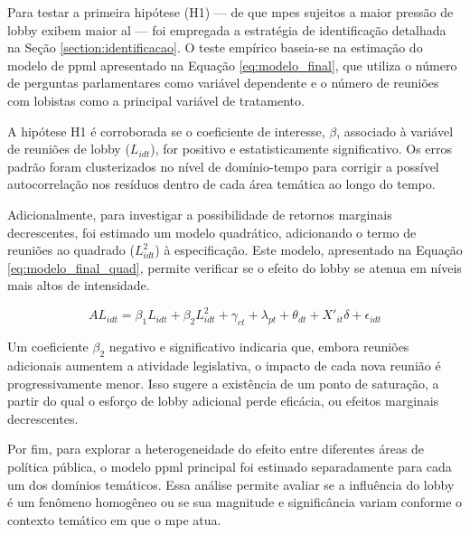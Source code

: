 Para testar a primeira hipótese (H1) — de que \acrshort{mpe}s sujeitos a maior pressão de lobby exibem maior \acrshort{al} — foi empregada a estratégia de identificação detalhada na Seção \ref{section:identificacao}. O teste empírico baseia-se na estimação do modelo de \acrshort{ppml} apresentado na Equação \ref{eq:modelo_final}, que utiliza o número de perguntas parlamentares como variável dependente e o número de reuniões com lobistas como a principal variável de tratamento.

A hipótese H1 é corroborada se o coeficiente de interesse, $\beta$, associado à variável de reuniões de lobby ($L_{idt}$), for positivo e estatisticamente significativo. Os erros padrão foram clusterizados no nível de domínio-tempo para corrigir a possível autocorrelação nos resíduos dentro de cada área temática ao longo do tempo.

Adicionalmente, para investigar a possibilidade de retornos marginais decrescentes, foi estimado um modelo quadrático, adicionando o termo de reuniões ao quadrado ($L_{idt}^2$) à especificação. Este modelo, apresentado na Equação \ref{eq:modelo_final_quad}, permite verificar se o efeito do lobby se atenua em níveis mais altos de intensidade.

\begin{equation}
    \label{eq:modelo_final_quad}
    AL_{idt} = \beta_1 L_{idt} + \beta_2 L_{idt}^2 + \gamma_{ct} + \lambda_{pt} + \theta_{dt} + X'_{it}\delta + \epsilon_{idt}
\end{equation}

Um coeficiente $\beta_2$ negativo e significativo indicaria que, embora reuniões adicionais aumentem a atividade legislativa, o impacto de cada nova reunião é progressivamente menor. Isso sugere a existência de um ponto de saturação, a partir do qual o esforço de lobby adicional perde eficácia, ou efeitos marginais decrescentes.

Por fim, para explorar a heterogeneidade do efeito entre diferentes áreas de política pública, o modelo \acrshort{ppml} principal foi estimado separadamente para cada um dos domínios temáticos. Essa análise permite avaliar se a influência do lobby é um fenômeno homogêneo ou se sua magnitude e significância variam conforme o contexto temático em que o \acrshort{mpe} atua.

